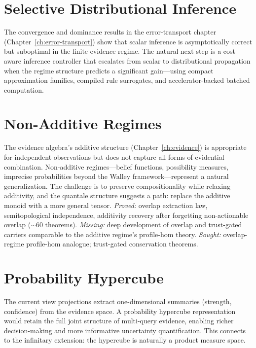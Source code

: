 \documentclass[11pt,openany]{report}
\begin{document}
\section{Selective Distributional Inference}

The convergence and dominance results in the error-transport chapter
(Chapter~\ref{ch:error-transport}) show that scalar inference is
asymptotically correct but suboptimal in the finite-evidence regime.
The natural next step is a cost-aware inference controller that
escalates from scalar to distributional propagation when the regime
structure predicts a significant gain---using compact approximation
families, compiled rule surrogates, and accelerator-backed batched
computation.

\section{Non-Additive Regimes}

The evidence algebra's additive structure
(Chapter~\ref{ch:evidence}) is appropriate for independent
observations but does not capture all forms of evidential
combination.  Non-additive regimes---belief functions,
possibility measures, imprecise probabilities beyond the Walley
framework---represent a natural generalization.  The challenge is to
preserve compositionality while relaxing additivity, and the
quantale structure suggests a path: replace the additive monoid with
a more general tensor.
\emph{Proved:} overlap extraction law, semitopological
independence, additivity recovery after forgetting non-actionable
overlap ($\sim$60 theorems).
\emph{Missing:} deep development of overlap and trust-gated
carriers comparable to the additive regime's profile-hom theory.
\emph{Sought:} overlap-regime profile-hom analogue; trust-gated
conservation theorems.

\section{Probability Hypercube}

The current view projections extract one-dimensional summaries
(strength, confidence) from the evidence space.  A probability
hypercube representation would retain the full joint structure of
multi-query evidence, enabling richer decision-making and more
informative uncertainty quantification.  This connects to the
infinitary extension: the hypercube is naturally a product measure
space.
\end{document}
